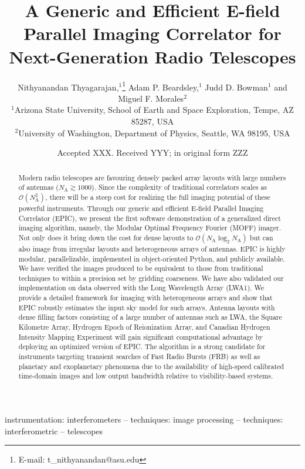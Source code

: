 \documentclass[a4paper,fleqn,usenatbib]{mnras}
\title[E-field Parallel Imaging Correlator]{A Generic and Efficient E-field Parallel Imaging Correlator for Next-Generation Radio Telescopes}
\author[Thyagarajan et al.]{
Nithyanandan Thyagarajan,$^{1}$\thanks{E-mail: t\_nithyanandan@asu.edu}
Adam P. Beardsley,$^{1}$
Judd D. Bowman$^{1}$
\newauthor
and Miguel F. Morales$^{2}$
\\
$^{1}$Arizona State University, School of Earth and Space Exploration, Tempe, AZ 85287, USA\\
$^{2}$University of Washington, Department of Physics, Seattle, WA 98195, USA\\
}
\date{Accepted XXX. Received YYY; in original form ZZZ}
\newcommand{\Nant}{N_\textrm{A}}
\begin{document}
\label{firstpage}
\pagerange{\pageref{firstpage}--\pageref{lastpage}}
\maketitle

\begin{abstract}
Modern radio telescopes are favouring densely packed array layouts with large numbers of antennas ($\Nant\gtrsim 1000$). Since the complexity of traditional correlators scales as $\mathcal{O}(\Nant^2)$, there will be a steep cost for realizing the full imaging potential of these powerful instruments. Through our generic and efficient E-field Parallel Imaging Correlator (EPIC), we present the first software demonstration of a generalized direct imaging algorithm, namely, the Modular Optimal Frequency Fourier (MOFF) imager. Not only does it bring down the cost for dense layouts to $\mathcal{O}(\Nant\log_2\Nant)$ but can also image from irregular layouts and heterogeneous arrays of antennas. EPIC is highly modular, parallelizable, implemented in object-oriented Python, and publicly available. We have verified the images produced to be equivalent to those from traditional techniques to within a precision set by gridding coarseness. We have also validated our implementation on data observed with the Long Wavelength Array (LWA1). We provide a detailed framework for imaging with heterogeneous arrays and show that EPIC robustly estimates the input sky model for such arrays. Antenna layouts with dense filling factors consisting of a large number of antennas such as LWA, the Square Kilometre Array, Hydrogen Epoch of Reionization Array, and Canadian Hydrogen Intensity Mapping Experiment will gain significant computational advantage by deploying an optimized version of EPIC. The algorithm is a strong candidate for instruments targeting transient searches of Fast Radio Bursts (FRB) as well as planetary and exoplanetary phenomena due to the availability of high-speed calibrated time-domain images and low output bandwidth relative to visibility-based systems.
\end{abstract}

\begin{keywords}
instrumentation: interferometers -- techniques: image processing -- techniques: interferometric -- telescopes
\end{keywords}

\end{document}
